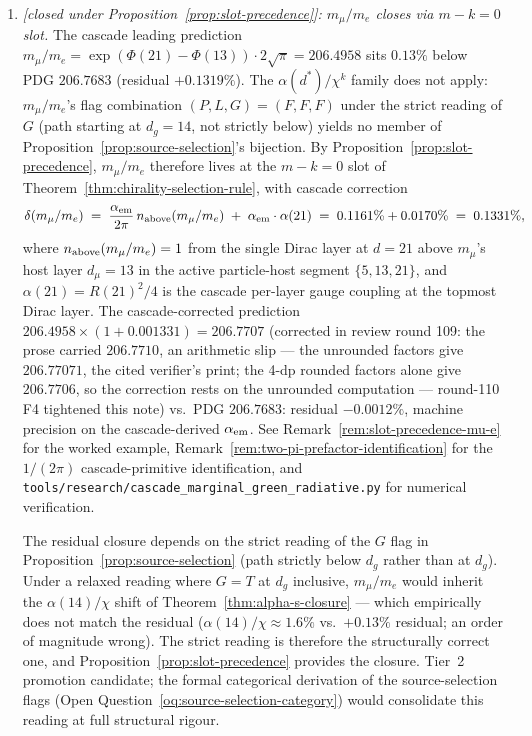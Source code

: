 \documentclass[12pt,a4paper]{article}
\begin{document}
\begin{enumerate}
\item\label{oq:mu-e-residual} \emph{[closed under Proposition~\ref{prop:slot-precedence}]: $m_\mu/m_e$ closes via $m{-}k = 0$ slot.} The cascade leading prediction $m_\mu/m_e = \exp(\Phi(21)-\Phi(13))\cdot 2\sqrt{\pi} = 206.4958$ sits $0.13\%$ below PDG $206.7683$ (residual $+0.1319\%$). The $\alpha(d^*)/\chi^k$ family does not apply: $m_\mu/m_e$'s flag combination $(P, L, G) = (F, F, F)$ under the strict reading of $G$ (path starting at $d_g = 14$, not strictly below) yields no member of Proposition~\ref{prop:source-selection}'s bijection. By Proposition~\ref{prop:slot-precedence}, $m_\mu/m_e$ therefore lives at the $m-k = 0$ slot of Theorem~\ref{thm:chirality-selection-rule}, with cascade correction
\[
\delta(m_\mu/m_e) \;=\; \frac{\alpha_{\rm em}}{2\pi}\,n_{\rm above}(m_\mu/m_e) \;+\; \alpha_{\rm em}\cdot\alpha(21)
\;=\; 0.1161\% + 0.0170\% \;=\; 0.1331\%,
\]
where $n_{\rm above}(m_\mu/m_e) = 1$ from the single Dirac layer at $d=21$ above $m_\mu$'s host layer $d_\mu = 13$ in the active particle-host segment $\{5, 13, 21\}$, and $\alpha(21) = R(21)^2/4$ is the cascade per-layer gauge coupling at the topmost Dirac layer. The cascade-corrected prediction $206.4958 \times (1 + 0.001331) = 206.7707$ (corrected in review round 109: the prose carried $206.7710$, an arithmetic slip --- the unrounded factors give $206.77071$, the cited verifier's print; the 4-dp rounded factors alone give $206.7706$, so the correction rests on the unrounded computation --- round-110 F4 tightened this note) vs.\ PDG $206.7683$: residual $-0.0012\%$, machine precision on the cascade-derived $\alpha_{\rm em}$. See Remark~\ref{rem:slot-precedence-mu-e} for the worked example, Remark~\ref{rem:two-pi-prefactor-identification} for the $1/(2\pi)$ cascade-primitive identification, and \texttt{tools/research/cascade\_marginal\_green\_radiative.py} for numerical verification.

The residual closure depends on the strict reading of the $G$ flag in Proposition~\ref{prop:source-selection} (path strictly below $d_g$ rather than at $d_g$). Under a relaxed reading where $G = T$ at $d_g$ inclusive, $m_\mu/m_e$ would inherit the $\alpha(14)/\chi$ shift of Theorem~\ref{thm:alpha-s-closure} --- which empirically does not match the residual ($\alpha(14)/\chi \approx 1.6\%$ vs.\ $+0.13\%$ residual; an order of magnitude wrong). The strict reading is therefore the structurally correct one, and Proposition~\ref{prop:slot-precedence} provides the closure. Tier~2 promotion candidate; the formal categorical derivation of the source-selection flags (Open Question~\ref{oq:source-selection-category}) would consolidate this reading at full structural rigour.


\end{enumerate}
\end{document}
